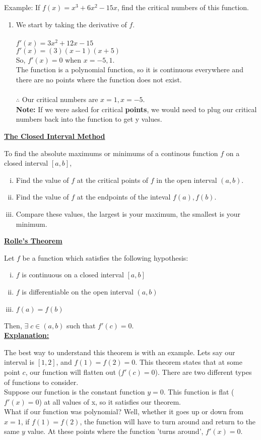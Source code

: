 \documentclass{letter}
\begin{document}
	Example: If $f(x) = x^3 + 6x^2 - 15x$, find the critical numbers of this function.
	\begin{enumerate}[ ]
		\item We start by taking the derivative of $f$.\\\\
		$f'(x) = 3x^2 + 12x - 15$\\
		$f'(x) = (3)(x-1)(x+5)$\\
		
		So, $f'(x) = 0$ when $x = -5, 1$.\\
		The function is a polynomial function, so it is continuous everywhere and there are no points where the function does not exist.\\\\
		$\therefore$ Our critical numbers are $x=1, x=-5$.\\
		\textbf{Note:} If we were asked for critical \textbf{points}, we would need to plug our critical numbers back into the function to get y values.
	\end{enumerate}
	
	\underline{\textbf{The Closed Interval Method}}
	
	To find the absolute maximums or minimums of a continous function $f$ on a closed interval $[a, b]$,
	\begin{enumerate}[i)]
		\item Find the value of $f$ at the critical points of $f$ in the open interval $(a, b)$.
		\item Find the value of $f$ at the endpoints of the inteval $f(a), f(b)$.
		\item Compare these values, the largest is your maximum, the smallest is your minimum.
	\end{enumerate}
	\pagebreak
	\underline{\textbf{Rolle's Theorem}}
	
	Let $f$ be a function which satisfies the following hypothesis:
	\begin{enumerate}[i)]
		\item $f$ is continuous on a closed interval $[a, b]$
		\item $f$ is differentiable on the open interval $(a, b)$
		\item $f(a) = f(b)$
	\end{enumerate}
	
	Then, $\exists\; c \in (a, b)$ such that $f'(c) = 0$.\\
	
	\underline{\textbf{Explanation:}}
	
	The best way to understand this theorem is with an example. Lets say our interval is $[1, 2]$, and $f(1) = f(2) = 0$. This theorem states that at some point $c$, our function will flatten out ($f'(c) = 0$). There are two different types of functions to consider. \\
	Suppose our function is the constant function $y=0$. This function is flat ($f'(x) = 0$) at all values of x, so it satisfies our theorem.\\
	What if our function was polynomial? Well, whether it goes up or down from $x=1$, if $f(1) = f(2)$, the function will have to turn around and return to the same $y$ value. At these points where the function 'turns around', $f'(x) = 0$.
\end{document}

